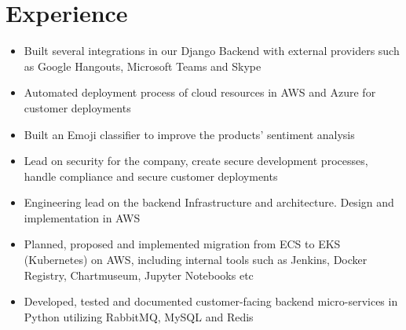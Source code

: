 \documentclass{cv_doc}
\begin{document}
\vspace{0.5cm}


\section*{Experience}


\begin{itemize}[label={\tiny\raisebox{1ex}{\textbullet}}]
  \item {Built several integrations in our Django Backend with external providers such as Google Hangouts, Microsoft Teams and Skype}
  \item {Automated deployment process of cloud resources in AWS and Azure for customer deployments}
  \item {Built an Emoji classifier to improve the products' sentiment analysis}
  \item {Lead on security for the company, create secure development processes, handle compliance and secure customer deployments}
\end{itemize}


\begin{itemize}[label={\tiny\raisebox{1ex}{\textbullet}}]
  \item {Engineering lead on the backend Infrastructure and architecture. Design and implementation in AWS}
  \item {Planned, proposed and implemented migration from ECS to EKS (Kubernetes) on AWS, including internal tools such as Jenkins, Docker Registry, Chartmuseum, Jupyter Notebooks etc}
  \item {Developed, tested and documented customer-facing backend micro-services in Python utilizing RabbitMQ, MySQL and Redis}
\end{itemize}

\end{document}
